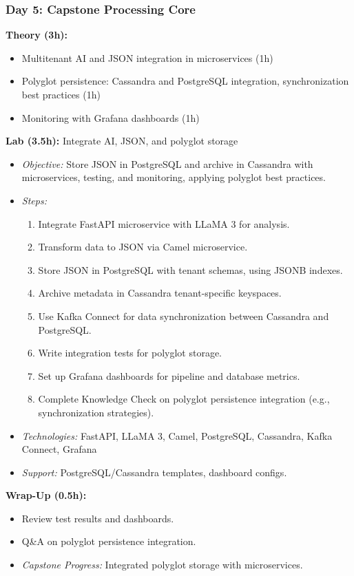 \documentclass[11pt]{article}
\begin{document}
\subsubsection{Day 5: Capstone Processing Core}
\textbf{Theory (3h):}
\begin{itemize}
    \item Multitenant AI and JSON integration in microservices (1h)
    \item Polyglot persistence: Cassandra and PostgreSQL integration, synchronization best practices (1h)
    \item Monitoring with Grafana dashboards (1h)
\end{itemize}
\textbf{Lab (3.5h):} Integrate AI, JSON, and polyglot storage
\begin{itemize}
    \item \textit{Objective:} Store JSON in PostgreSQL and archive in Cassandra with microservices, testing, and monitoring, applying polyglot best practices.
    \item \textit{Steps:}
        \begin{enumerate}
            \item Integrate FastAPI microservice with LLaMA 3 for analysis.
            \item Transform data to JSON via Camel microservice.
            \item Store JSON in PostgreSQL with tenant schemas, using JSONB indexes.
            \item Archive metadata in Cassandra tenant-specific keyspaces.
            \item Use Kafka Connect for data synchronization between Cassandra and PostgreSQL.
            \item Write integration tests for polyglot storage.
            \item Set up Grafana dashboards for pipeline and database metrics.
            \item Complete Knowledge Check on polyglot persistence integration (e.g., synchronization strategies).
        \end{enumerate}
    \item \textit{Technologies:} FastAPI, LLaMA 3, Camel, PostgreSQL, Cassandra, Kafka Connect, Grafana
    \item \textit{Support:} PostgreSQL/Cassandra templates, dashboard configs.
\end{itemize}
\textbf{Wrap-Up (0.5h):}
\begin{itemize}
    \item Review test results and dashboards.
    \item Q\&A on polyglot persistence integration.
    \item \textit{Capstone Progress:} Integrated polyglot storage with microservices.
\end{itemize}
\end{document}
